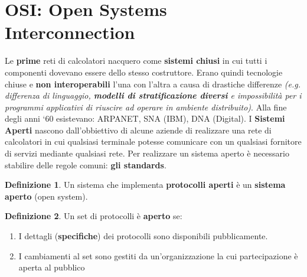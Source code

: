 \documentclass[11pt,a4paper,oneside]{book}
\theoremstyle{definition}
\newtheorem{definition}{Definizione}[section]
\begin{document}
\section{OSI: Open Systems Interconnection}
Le \textbf{prime} reti di calcolatori nacquero come \textbf{sistemi chiusi} in cui tutti i componenti dovevano essere dello stesso costruttore. Erano quindi tecnologie chiuse e \textbf{non interoperabili} l'una con l'altra a causa di drastiche differenze \textit{(e.g. differenza di linguaggio, \textbf{modelli di stratificazione diversi} e impossibilità per i programmi applicativi di riuscire ad operare in ambiente distribuito)}. Alla fine degli anni ‘60 esistevano: ARPANET, SNA (IBM), DNA (Digital).\newline
I \textbf{Sistemi Aperti} nascono dall'obbiettivo di alcune aziende di realizzare una rete di calcolatori in cui qualsiasi terminale potesse comunicare con un qualsiasi fornitore di servizi mediante qualsiasi rete.\newline\newline
Per realizzare un sistema aperto è necessario stabilire delle regole comuni: \textbf{gli standards}.
\theoremstyle{definition}
\begin{definition}
	Un sistema che implementa \textbf{protocolli aperti} è un \textbf{sistema aperto} (open system).
\end{definition}
\begin{definition}
	Un set di protocolli è \textbf{aperto} se:
	\begin{enumerate}
		\item I dettagli (\textbf{specifiche}) dei protocolli sono disponibili pubblicamente.
		\item I cambiamenti al set sono gestiti da un’organizzazione la cui
		      partecipazione è aperta al pubblico
	\end{enumerate}
\end{definition}
\end{document}
